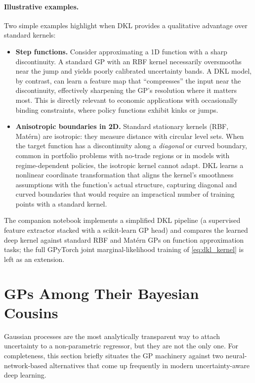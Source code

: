 \documentclass[11pt,a4paper]{report}
\begin{document}
\paragraph{Illustrative examples.}
Two simple examples highlight when DKL provides a qualitative advantage over standard kernels:
\begin{itemize}[itemsep=2pt]
\item \textbf{Step functions.}  Consider approximating a 1D function with a sharp discontinuity.  A standard GP with an RBF kernel necessarily oversmooths near the jump and yields poorly calibrated uncertainty bands.  A DKL model, by contrast, can learn a feature map that ``compresses'' the input near the discontinuity, effectively sharpening the GP's resolution where it matters most.  This is directly relevant to economic applications with occasionally binding constraints, where policy functions exhibit kinks or jumps.
\item \textbf{Anisotropic boundaries in 2D.}  Standard stationary kernels (RBF, Mat\'ern) are isotropic: they measure distance with circular level sets.  When the target function has a discontinuity along a \emph{diagonal} or curved boundary, common in portfolio problems with no-trade regions or in models with regime-dependent policies, the isotropic kernel cannot adapt.  DKL learns a nonlinear coordinate transformation that aligns the kernel's smoothness assumptions with the function's actual structure, capturing diagonal and curved boundaries that would require an impractical number of training points with a standard kernel.
\end{itemize}

\begin{remarkbox}[Hands-on]
The companion notebook  implements a simplified DKL pipeline (a supervised feature extractor stacked with a scikit-learn GP head) and compares the learned deep kernel against standard RBF and Mat\'ern GPs on function approximation tasks; the full GPyTorch joint marginal-likelihood training of \eqref{eq:dkl_kernel} is left as an extension.
\end{remarkbox}

\section{GPs Among Their Bayesian Cousins}
\label{sec:bayesian_dl_compare}

Gaussian processes are the most analytically transparent way to attach uncertainty to a non-parametric regressor, but they are not the only one.  For completeness, this section briefly situates the GP machinery against two neural-network-based alternatives that come up frequently in modern uncertainty-aware deep learning.
\end{document}
